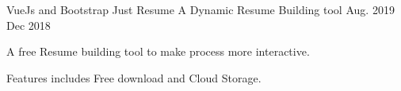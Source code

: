 \begin{cventries}
    \cventry
    {VueJs and Bootstrap}
    {Just Resume}
    {A Dynamic Resume Building tool}
    {Aug. 2019  Dec 2018}
    {
      \begin{cvitems}
        \item {A free Resume building tool to make process more interactive.}
        \item{Features includes Free download and Cloud Storage. }
      \end{cvitems}
    }
\end{cventries}
